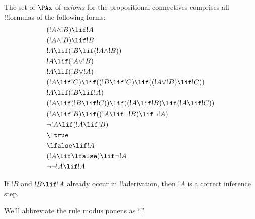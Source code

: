 \documentclass[../../../include/open-logic-section]{subfiles}
\begin{document}
      {}
      {}


\begin{defn}[Axioms]
The set of $\PAx$ of \emph{axioms} for the propositional connectives comprises
all !!{formula}s of the following forms:
\begin{align}
  & (!A \land !B) \lif !A \ollabel{ax:land1}\\
  & (!A \land !B) \lif !B \ollabel{ax:land2}\\
  & !A \lif (!B \lif (!A \land !B)) \ollabel{ax:land3}\\
  & !A \lif (!A \lor !B) \ollabel{ax:lor1}\\
  & !A \lif (!B \lor !A) \ollabel{ax:lor2}\\
  & (!A \lif !C) \lif ((!B \lif !C) \lif ((!A \lor !B) \lif !C)) \ollabel{ax:lor3}\\
  & !A \lif (!B \lif !A) \ollabel{ax:lif1}\\
  & (!A \lif (!B \lif !C)) \lif ((!A \lif !B) \lif (!A \lif !C)) \ollabel{ax:lif2}\\
  & (!A \lif !B) \lif ((!A \lif \lnot !B) \lif \lnot !A) \ollabel{ax:lnot1}\\
  & \lnot !A \lif (!A \lif !B) \ollabel{ax:lnot2}\\
  & \ltrue \ollabel{ax:ltrue}\\
  & \lfalse \lif !A \ollabel{ax:lfalse1}\\
  & (!A \lif \lfalse) \lif \lnot !A \ollabel{ax:lfalse2}\\
  & \lnot\lnot !A \lif !A \ollabel{ax:dne}
\end{align}
\end{defn}

\begin{defn}
  If $!B$ and $!B \lif !A$ already occur in !!a{derivation}, then $!A$ is
  a correct inference step.
\end{defn}

We'll abbreviate the rule modus ponens as ``\MP.''
\end{document}
